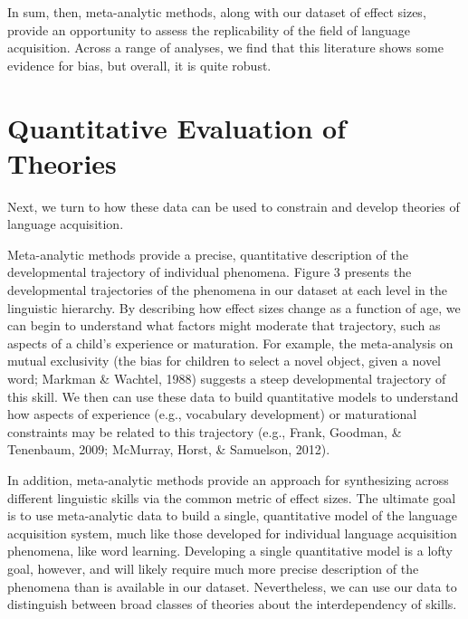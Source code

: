 \documentclass[english,floatsintext,man]{apa6}
\theoremstyle{definition}
\theoremstyle{definition}
\theoremstyle{remark}
\begin{document}
In sum, then, meta-analytic methods, along with our dataset of effect
sizes, provide an opportunity to assess the replicability of the field
of language acquisition. Across a range of analyses, we find that this
literature shows some evidence for bias, but overall, it is quite
robust.

\section{Quantitative Evaluation of
Theories}\label{quantitative-evaluation-of-theories}

Next, we turn to how these data can be used to constrain and develop
theories of language acquisition.

Meta-analytic methods provide a precise, quantitative description of the
developmental trajectory of individual phenomena. Figure 3 presents the
developmental trajectories of the phenomena in our dataset at each level
in the linguistic hierarchy. By describing how effect sizes change as a
function of age, we can begin to understand what factors might moderate
that trajectory, such as aspects of a child's experience or maturation.
For example, the meta-analysis on mutual exclusivity (the bias for
children to select a novel object, given a novel word; Markman \&
Wachtel, 1988) suggests a steep developmental trajectory of this skill.
We then can use these data to build quantitative models to understand
how aspects of experience (e.g., vocabulary development) or maturational
constraints may be related to this trajectory (e.g., Frank, Goodman, \&
Tenenbaum, 2009; McMurray, Horst, \& Samuelson, 2012).

In addition, meta-analytic methods provide an approach for synthesizing
across different linguistic skills via the common metric of effect
sizes. The ultimate goal is to use meta-analytic data to build a single,
quantitative model of the language acquisition system, much like those
developed for individual language acquisition phenomena, like word
learning. Developing a single quantitative model is a lofty goal,
however, and will likely require much more precise description of the
phenomena than is available in our dataset. Nevertheless, we can use our
data to distinguish between broad classes of theories about the
interdependency of skills.
\end{document}
